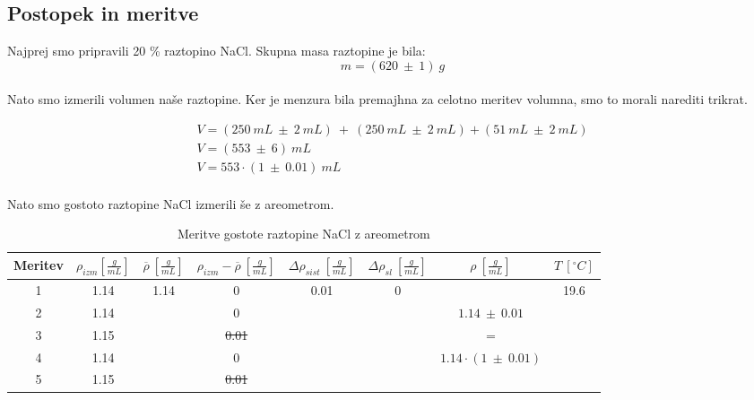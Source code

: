 \documentclass{report}
\begin{document}
\pagebreak

\subsection{Postopek in meritve}

Najprej smo pripravili 20 \% raztopino NaCl. Skupna masa raztopine je bila:
\begin{equation}
  m = (620 \ \pm \ 1 )\ g 
\end{equation}
\\
Nato smo izmerili volumen naše raztopine. Ker je menzura bila premajhna za 
celotno meritev volumna, smo to morali narediti trikrat.

\begin{equation}
  \label{eq:1}
  \begin{gathered}
    V = (250 \ mL \ \pm \ 2 \ mL) \ + \ (250 \ mL \ \pm \ 2 \ mL) + (51 \ mL \ \pm \ 2 \ mL) \\
    V = (553 \ \pm \ 6) \ mL \\
    V = 553 \cdot (1 \ \pm \ 0.01) \ mL
  \end{gathered}
\end{equation}
\\

Nato smo gostoto raztopine NaCl izmerili še z areometrom.

\begin{table}[H]
  \centering
  \caption{Meritve gostote raztopine NaCl z areometrom}
  \begin{adjustwidth}{-2cm}{0cm}
  \begin{tabular}{cccccccc}
  \toprule
  Meritev & $\rho_{izm} \left[ \frac{g}{mL} \right]$ & $\overline{\rho}\ \left[ \frac{g}{mL} \right]$ & $\rho_{izm} - \overline{\rho}\ \left[ \frac{g}{mL} \right]$ & $\Delta \rho_{sist}\ \left[ \frac{g}{mL} \right]$ & $\Delta \rho_{sl}\ \left[ \frac{g}{mL} \right]$ & $\rho\ \left[ \frac{g}{mL} \right]$ & $T \ [^{\circ}C] $\\
  \midrule
  1 & 1.14 & \multirow{5}{*}{1.14} & 0 & \multirow{5}{*}{0.01} & \multirow{5}{*}{0} & & \multirow{5}{*}{19.6}\\
  2 & 1.14 &  & 0 & & & $1.14 \ \pm \ 0.01 $\\
  3 & 1.15 &  & \sout{0.01} & & & = \\
  4 & 1.14 &  & 0 & & & $1.14 \cdot (1 \ \pm \ 0.01)$\\
  5 & 1.15 &  & \sout{0.01} & & & \\
  \bottomrule
  \end{tabular}
  \end{adjustwidth}
\end{table}
\end{document}
